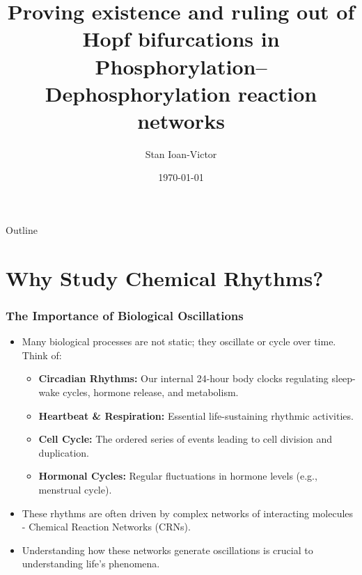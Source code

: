 \documentclass[aspectratio=169]{beamer}
\title[Hopf Bifurcations in CRNs]{Proving existence and ruling out of Hopf bifurcations in Phosphorylation–Dephosphorylation reaction networks}
\author{Stan Ioan-Victor}
\date{\today}
\institute{UBB MIE3}
\begin{document}
\begin{frame}[plain]
	\titlepage
\end{frame}

\begin{frame}{Outline}
	\tableofcontents
\end{frame}

\section{Why Study Chemical Rhythms?}

\begin{frame}{\insertsectionhead}
	\frametitle{The Importance of Biological Oscillations}
	\begin{itemize}
		\item Many biological processes are not static; they \alert{oscillate} or cycle over time. Think of:
			\begin{itemize}
				\item \textbf{Circadian Rhythms:} Our internal 24-hour body clocks regulating sleep-wake cycles, hormone release, and metabolism.
				\item \textbf{Heartbeat \& Respiration:} Essential life-sustaining rhythmic activities.
				\item \textbf{Cell Cycle:} The ordered series of events leading to cell division and duplication.
				\item \textbf{Hormonal Cycles:} Regular fluctuations in hormone levels (e.g., menstrual cycle).
			\end{itemize}
		\item These rhythms are often driven by complex networks of interacting molecules - \alert{Chemical Reaction Networks (CRNs)}.
		\item Understanding how these networks generate oscillations is crucial to understanding life's phenomena.
	\end{itemize}
\end{frame}
\end{document}
